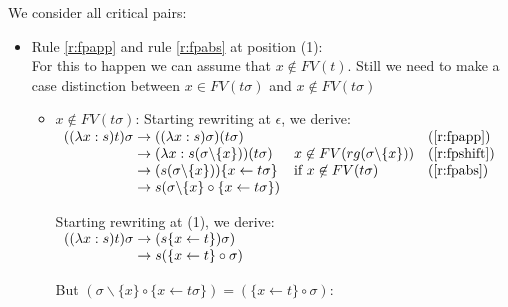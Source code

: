 \documentclass[a4paper]{article}
\newcommand{\fpsubstin}[1]{\{#1\}}
\newcommand{\fpscat}[0]{\circ}
\newcommand{\fpwith}{\leftarrow}
\newcommand{\fpwithoutset}[1]{\backslash\{#1\}}
\newcommand{\rewrites}[0]{\;\rightarrow\;}
\theoremstyle{definition}
\begin{document}
We consider all critical pairs:
\begin{itemize}
\item Rule \ref{r:fpapp} and rule \ref{r:fpabs} at position (1):\\
  For this to happen we can assume that $x \not \in FV(t)$. Still we need to
  make a case distinction between $x \in FV(t\sigma)$ and $x \not \in FV(t\sigma)$\\

  \begin{itemize}
  \item $x \not \in FV(t\sigma)$: Starting rewriting at $\epsilon$, we derive:\\
    $
    \begin{array}{r@{\rewrites}lll}
      ((\lambda x:s)t)\sigma & ((\lambda x:s)\sigma)(t\sigma) & & (\ref{r:fpapp})\\
                             & (\lambda x : s(\sigma\fpwithoutset{x}))
                               (t\sigma) & x \not\in FV(rg(\sigma\fpwithoutset{x}))
                                                                & (\ref{r:fpshift})\\
                             & (s(\sigma\fpwithoutset{x}))\fpsubstin{
                               x \fpwith t\sigma} &  \mbox{if }x \not
                                                    \in FV(t\sigma) & (\ref{r:fpabs})\\
                             & s(\sigma\fpwithoutset{x} \fpscat
                               \fpsubstin{x \fpwith t\sigma}) & \\
    \end{array}
    $

    Starting rewriting at (1), we derive:\\

    $
    \begin{array}{r@{\rewrites}l}
      ((\lambda x:s)t)\sigma & (s\fpsubstin{x \fpwith t})\sigma ) \\
                             & s(\fpsubstin{x \fpwith t} \fpscat \sigma ) \\
    \end{array}
    $

    But $(\sigma\fpwithoutset{x} \fpscat \fpsubstin{x \fpwith t\sigma}) =
    (\fpsubstin{x \fpwith t} \fpscat \sigma)$:


\end{itemize}
\end{itemize}
\end{document}
